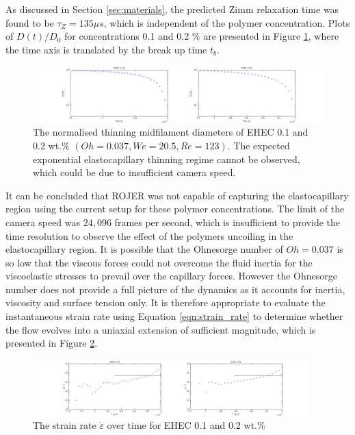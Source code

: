\documentclass[11pt]{article}
\begin{document}
As discussed in Section \ref{sec:materials}, the predicted Zimm relaxation time was found to be $\tau_{Z} = 135 \mu s$, which is independent of the polymer concentration. Plots of $D(t)/D_0$ for concentrations 0.1 and 0.2 \% are presented in Figure \ref{fig:1_2_EHEC}, where the time axis is translated by the break up time $t_b$.
\begin{figure}[h]
	\begin{center}
		\includegraphics[scale = 0.45, trim = 7cm 0cm 6cm 0cm]{img/1_2_EHEC.png}
		\caption{The normalised thinning midfilament diameters of EHEC 0.1 and 0.2 wt.\% $ \left(Oh = 0.037 , We = 20.5, Re = 123 \right)$. The expected exponential elastocapillary thinning regime cannot be observed, which could be due to insufficient camera speed.}
		\label{fig:1_2_EHEC}
	\end{center}
\end{figure}

It can be concluded that ROJER was not capable of capturing the elastocapillary region using the current setup for these polymer concentrations. The limit of the camera speed was $24,096$ frames per second, which is insufficient to provide the time resolution to observe the effect of the polymers uncoiling in the elastocapillary region. It is possible that the Ohnesorge number of $Oh = 0.037$ is so low that the viscous forces could not overcome the fluid inertia for the viscoelastic stresses to prevail over the capillary forces. However the Ohnesorge number does not provide a full picture of the dynamics as it accounts for inertia, viscosity and surface tension only. It is therefore appropriate to evaluate the instantaneous strain rate using Equation \ref{eqn:strain_rate} to determine whether the flow evolves into a uniaxial extension of sufficient magnitude, which is presented in Figure \ref{fig:1_2_EHEC_strain}. 
\begin{figure}[h]
	\begin{center}
		\includegraphics[width=0.95\textwidth, trim = 7cm 0cm 6cm 0cm]{img/1_2_EHEC_strain.png}
		\caption{The strain rate $\dot{\varepsilon}$ over time for EHEC 0.1 and 0.2 wt.\%}
		\label{fig:1_2_EHEC_strain}
	\end{center}
\end{figure}
\end{document}

